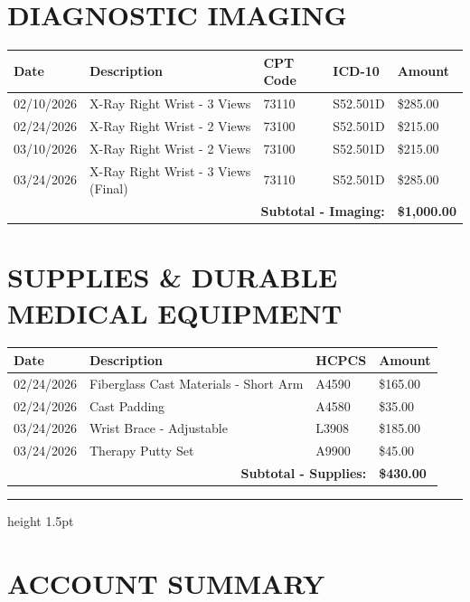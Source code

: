 \documentclass[11pt]{article}
\begin{document}
\section*{DIAGNOSTIC IMAGING}

\begin{longtable}{@{}p{2cm}p{6cm}p{2cm}p{2cm}p{2.5cm}@{}}
\toprule
\textbf{Date} & \textbf{Description} & \textbf{CPT Code} & \textbf{ICD-10} & \textbf{Amount} \\
\midrule
\endhead

02/10/2026 & X-Ray Right Wrist - 3 Views & 73110 & S52.501D & \$285.00 \\
02/24/2026 & X-Ray Right Wrist - 2 Views & 73100 & S52.501D & \$215.00 \\
03/10/2026 & X-Ray Right Wrist - 2 Views & 73100 & S52.501D & \$215.00 \\
03/24/2026 & X-Ray Right Wrist - 3 Views (Final) & 73110 & S52.501D & \$285.00 \\
\midrule
\multicolumn{4}{r}{\textbf{Subtotal - Imaging:}} & \textbf{\$1,000.00} \\
\bottomrule
\end{longtable}

\section*{SUPPLIES \& DURABLE MEDICAL EQUIPMENT}

\begin{longtable}{@{}p{2cm}p{8cm}p{2.5cm}p{2.5cm}@{}}
\toprule
\textbf{Date} & \textbf{Description} & \textbf{HCPCS} & \textbf{Amount} \\
\midrule
\endhead

02/24/2026 & Fiberglass Cast Materials - Short Arm & A4590 & \$165.00 \\
02/24/2026 & Cast Padding & A4580 & \$35.00 \\
03/24/2026 & Wrist Brace - Adjustable & L3908 & \$185.00 \\
03/24/2026 & Therapy Putty Set & A9900 & \$45.00 \\
\midrule
\multicolumn{3}{r}{\textbf{Subtotal - Supplies:}} & \textbf{\$430.00} \\
\bottomrule
\end{longtable}

\vspace{1em}
\hrule height 1.5pt
\vspace{0.5em}

\section*{ACCOUNT SUMMARY}
\end{document}

